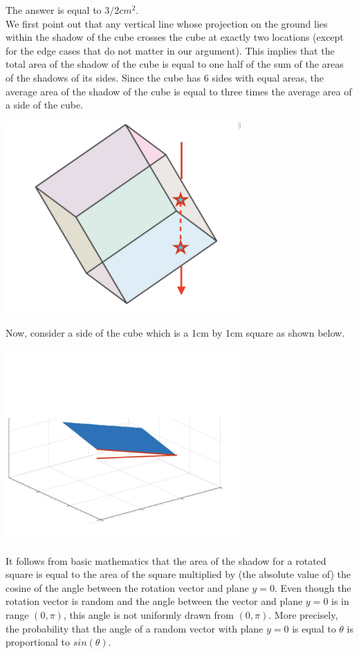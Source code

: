 \begin{solution}
The answer is equal to $3/2cm^2$.\\[0.2cm]
We first point out that any vertical line whose projection on the ground lies within the shadow of the cube crosses the cube at exactly two locations (except for the edge cases that do not matter in our argument). This implies that the total area of the shadow of the cube is equal to one half of the sum of the areas of the shadows of its sides. Since the cube has 6 sides with equal areas, the average area of the shadow of the cube is equal to three times the average area of a side of the cube.

\begin{center}
	\includegraphics[width=9cm]{59/figs/59_sol1.png}
\end{center}

Now, consider a side of the cube which is a 1cm by 1cm square as shown below.
\begin{center}
	\includegraphics[width=9cm]{59/figs/59_sol2.png}
\end{center}
It follows from basic mathematics that the area of the shadow for a rotated square is equal to the area of the square multiplied by (the absolute value of) the cosine of the angle between the rotation vector and plane $y=0$. 
Even though the rotation vector is random and the angle between the vector and plane $y=0$ is in range $(0, \pi)$, this angle is not uniformly drawn from $(0, \pi)$. More precisely, the probability that the angle of a random vector with plane $y=0$ is equal to $\theta$ is proportional to $sin(\theta)$.


\end{solution}
